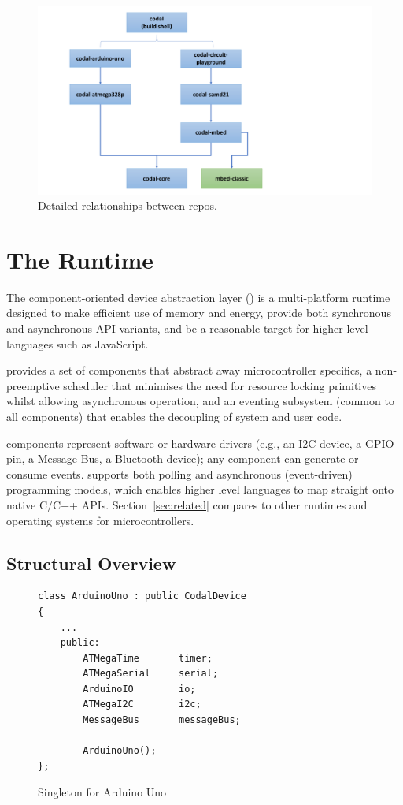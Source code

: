 \begin{figure}[t]
    \includegraphics[width=4.5in]{codalFig.pdf}
    \caption{\label{fig:codal}Detailed relationships between \CO repos.}
\end{figure}

\section{The \CO Runtime}
\label{sec:codal}

The component-oriented device abstraction layer (\CO) is a multi-platform runtime designed to make efficient use of memory and energy, provide both synchronous and asynchronous API variants, and be a reasonable target for higher level languages such as JavaScript.

\CO provides a set of components that abstract away microcontroller specifics, a non-preemptive scheduler that minimises the need for resource locking primitives whilst allowing asynchronous operation, and an eventing subsystem (common to all components) that enables the decoupling of system and user code. 

\CO components represent software or hardware drivers (e.g., an I2C device, a GPIO pin, a Message Bus, a Bluetooth device); any component can generate or consume events. \CO supports both polling and asynchronous (event-driven) programming models, which enables higher level languages to map straight onto native C/C++ APIs. Section~\ref{sec:related} compares \CO to other runtimes and operating systems for microcontrollers.


\subsection{Structural Overview}

\begin{figure}
\begin{lstlisting}
class ArduinoUno : public CodalDevice
{
    ...
    public:
        ATMegaTime       timer;
        ATMegaSerial     serial;
        ArduinoIO        io;
        ATMegaI2C        i2c;
        MessageBus       messageBus;

        ArduinoUno();
};
\end{lstlisting}
\caption{\label{fig:codalSingleton}Singleton for Arduino Uno}
\end{figure}

